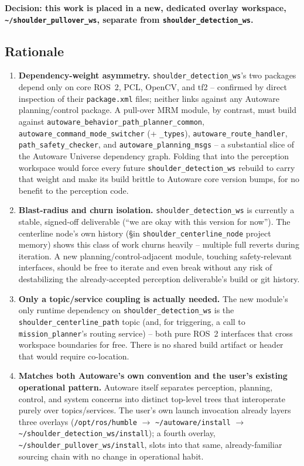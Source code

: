 \documentclass[11pt]{article}
\newcommand{\code}[1]{\texttt{#1}}
\newcommand{\pkg}[1]{\texttt{#1}}
\begin{document}
\textbf{Decision: this work is placed in a new, dedicated overlay workspace,
\code{\textasciitilde/shoulder\_pullover\_ws}, separate from \pkg{shoulder\_detection\_ws}.}

\subsection{Rationale}
\begin{enumerate}[leftmargin=1.6em]
  \item \textbf{Dependency-weight asymmetry.} \pkg{shoulder\_detection\_ws}'s two packages depend
  only on core ROS~2, PCL, OpenCV, and tf2 -- confirmed by direct inspection of their
  \code{package.xml} files; neither links against any Autoware planning/control package. A pull-over
  MRM module, by contrast, must build against
  \pkg{autoware\_behavior\_path\_planner\_common}, \pkg{autoware\_command\_mode\_switcher} (+
  \pkg{\_types}), \pkg{autoware\_route\_handler}, \pkg{path\_safety\_checker}, and
  \pkg{autoware\_planning\_msgs} -- a substantial slice of the Autoware Universe dependency graph.
  Folding that into the perception workspace would force every future \pkg{shoulder\_detection\_ws}
  rebuild to carry that weight and make its build brittle to Autoware core version bumps, for no
  benefit to the perception code.
  \item \textbf{Blast-radius and churn isolation.} \pkg{shoulder\_detection\_ws} is currently a
  stable, signed-off deliverable (``we are okay with this version for now''). The centerline node's
  own history (\S in \pkg{shoulder\_centerline\_node} project memory) shows this class of work churns
  heavily -- multiple full reverts during iteration. A new planning/control-adjacent module,
  touching safety-relevant interfaces, should be free to iterate and even break without any risk of
  destabilizing the already-accepted perception deliverable's build or git history.
  \item \textbf{Only a topic/service coupling is actually needed.} The new module's only runtime
  dependency on \pkg{shoulder\_detection\_ws} is the \code{shoulder\_centerline\_path} topic (and,
  for triggering, a call to \pkg{mission\_planner}'s routing service) -- both pure ROS~2 interfaces
  that cross workspace boundaries for free. There is no shared build artifact or header that would
  require co-location.
  \item \textbf{Matches both Autoware's own convention and the user's existing operational
  pattern.} Autoware itself separates perception, planning, control, and system concerns into
  distinct top-level trees that interoperate purely over topics/services. The user's own launch
  invocation already layers three overlays (\code{/opt/ros/humble} $\to$
  \code{\textasciitilde/autoware/install} $\to$ \code{\textasciitilde/shoulder\_detection\_ws/install}); a fourth overlay,
  \code{\textasciitilde/shoulder\_pullover\_ws/install}, slots into that same, already-familiar
  sourcing chain with no change in operational habit.
\end{enumerate}
\end{document}

